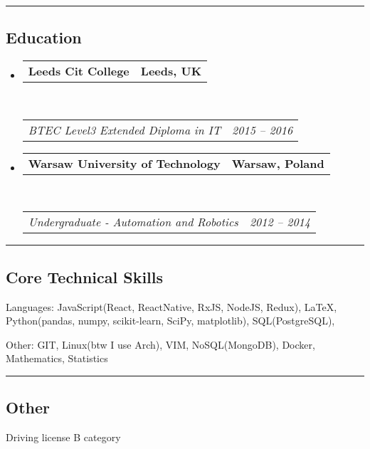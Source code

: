 \documentclass[10pt,letterpaper]{article}
\makeatletter
\newenvironment{indentsection}[1]%
{\begin{list}{}%
	{\setlength{\leftmargin}{#1}}%
	\item[]%
}
{\end{list}}
\newcommand{\headerrow}[2]
{\begin{tabular*}{\linewidth}{l@{\extracolsep{\fill}}r}
	#1 &
	#2 \\
\end{tabular*}}
\makeatother
\begin{document}
\hrule
\vspace{-0.4em}
\subsection*{Education}

\begin{itemize}
	\parskip=0.1em

	\item
	      \headerrow
	      {\textbf{Leeds Cit College}}
	      {\textbf{Leeds, UK}}
	      \\
	      \headerrow
	      {\emph{BTEC Level3 Extended Diploma in IT}}
	      {\emph{2015 -- 2016}}
	\item
	      \headerrow
	      {\textbf{Warsaw University of Technology}}
	      {\textbf{Warsaw, Poland}}
	      \\
	      \headerrow
	      {\emph{Undergraduate - Automation and Robotics}}
	      {\emph{2012 -- 2014}}

\end{itemize}


\hrule
\vspace{-0.4em}
\subsection*{Core Technical Skills}

\begin{indentsection}{\parindent}
	\begin{description*}
		\item[Languages:]
			JavaScript(React, ReactNative, RxJS, NodeJS, Redux), \LaTeX, Python(pandas, numpy, scikit-learn, SciPy, matplotlib), SQL(PostgreSQL),
		\item[Other:] GIT, Linux(btw I use Arch), VIM, NoSQL(MongoDB), Docker, Mathematics, Statistics
	\end{description*}
\end{indentsection}

\hrule
\vspace{-0.4em}
\subsection*{Other}
\begin{indentsection}{\parindent}
	\begin{description*}
		\item Driving license B category
	\end{description*}
\end{indentsection}
\end{document}

